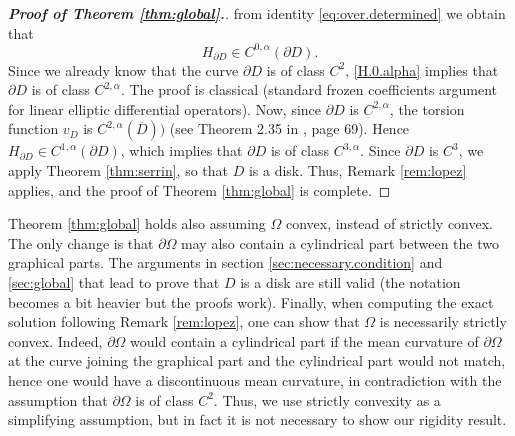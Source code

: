 \documentclass[10pt,reqno,a4paper]{article}
\numberwithin{equation}{section}
\theoremstyle{plain}
\theoremstyle{definition}
\newenvironment{remark}{\pushQED{\qed} \remarkbase}{\popQED\endremarkbase}
\newcommand{\s}{\sigma}
\newcommand{\la}{\langle}
\newcommand{\ra}{\rangle}
\newcommand{\pa}{\partial}
\newcommand{\grad}{\nabla}
\begin{document}
\begin{proof}[\textbf{Proof of Theorem \ref{thm:global}.}]
from identity \eqref{eq:over.determined} we obtain that
\begin{equation} \label{H.0.alpha}
H_{\pa D} \in C^{0,\alpha}(\pa D).
\end{equation}
Since we already know that the curve $\pa D$ is of class $C^2$, 
\eqref{H.0.alpha} implies that $\pa D$ is of class $C^{2,\alpha}$.
The proof is classical (standard frozen coefficients argument for linear elliptic differential operators). 
Now, since $\pa D$ is $C^{2,\alpha}$, the torsion function $v_D$ is $C^{2,\alpha}(\overline D))$
(see Theorem 2.35 in \cite{FR.Ros.Oton.2022}, page 69). 
Hence $H_{\pa D} \in C^{1,\alpha}(\pa D)$, which implies that $\pa D$ is of class $C^{3,\alpha}$. 
Since $\pa D$ is $C^3$, we apply Theorem \ref{thm:serrin}, so that $D$ is a disk. 
Thus, Remark \ref{rem:lopez} applies, 
and the proof of Theorem \ref{thm:global} is complete.
\end{proof}


\begin{remark}\label{rmk:final}
Theorem \ref{thm:global} holds also assuming $\Omega$ convex, instead of strictly convex.
The only change is that $\pa \Omega$ may also contain a cylindrical part between the two graphical parts. 
The arguments in section \ref{sec:necessary.condition} and \ref{sec:global} 
that lead to prove that $D$ is a disk 
are still valid (the notation becomes a bit heavier but the proofs work). 
Finally, when computing the exact solution following Remark \ref{rem:lopez}, 
one can show that $\Omega$ is necessarily strictly convex. 
Indeed, $\pa \Omega$ would contain a cylindrical part 
if the mean curvature of $\pa \Omega$ at the curve joining the graphical part 
and the cylindrical part would not match, 
hence one would have a discontinuous mean curvature, %
in contradiction with the assumption that $\pa \Omega$ is of class $C^2$.
Thus, we use strictly convexity as a simplifying assumption, %
but in fact it is not necessary to show our rigidity result. 
\end{remark}
 
%
\end{document}
